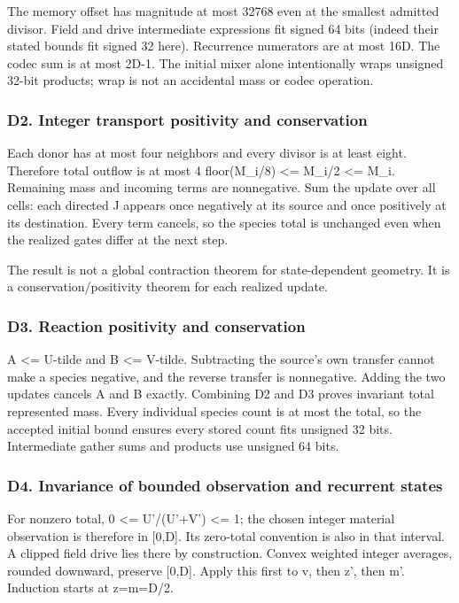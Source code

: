 \documentclass[11pt,a4paper]{article}
\begin{document}
The memory offset has magnitude at most 32768 even at the smallest admitted divisor. Field and drive intermediate expressions fit signed 64 bits (indeed their stated bounds fit signed 32 here). Recurrence numerators are at most 16D. The codec sum is at most 2D-1. The initial mixer alone intentionally wraps unsigned 32-bit products; wrap is not an accidental mass or codec operation.

\subsubsection{D2. Integer transport positivity and conservation}\label{d2.-integer-transport-positivity-and-conservation}

Each donor has at most four neighbors and every divisor is at least eight. Therefore total outflow is at most 4 floor(M\_i/8) \textless= M\_i/2 \textless= M\_i. Remaining mass and incoming terms are nonnegative. Sum the update over all cells: each directed J appears once negatively at its source and once positively at its destination. Every term cancels, so the species total is unchanged even when the realized gates differ at the next step.

The result is not a global contraction theorem for state-dependent geometry. It is a conservation/positivity theorem for each realized update.

\subsubsection{D3. Reaction positivity and conservation}\label{d3.-reaction-positivity-and-conservation}

A \textless= U-tilde and B \textless= V-tilde. Subtracting the source's own transfer cannot make a species negative, and the reverse transfer is nonnegative. Adding the two updates cancels A and B exactly. Combining D2 and D3 proves invariant total represented mass. Every individual species count is at most the total, so the accepted initial bound ensures every stored count fits unsigned 32 bits. Intermediate gather sums and products use unsigned 64 bits.

\subsubsection{D4. Invariance of bounded observation and recurrent states}\label{d4.-invariance-of-bounded-observation-and-recurrent-states}

For nonzero total, 0 \textless= U'/(U'+V') \textless= 1; the chosen integer material observation is therefore in {[}0,D{]}. Its zero-total convention is also in that interval. A clipped field drive lies there by construction. Convex weighted integer averages, rounded downward, preserve {[}0,D{]}. Apply this first to v, then z', then m'. Induction starts at z=m=D/2.
\end{document}
